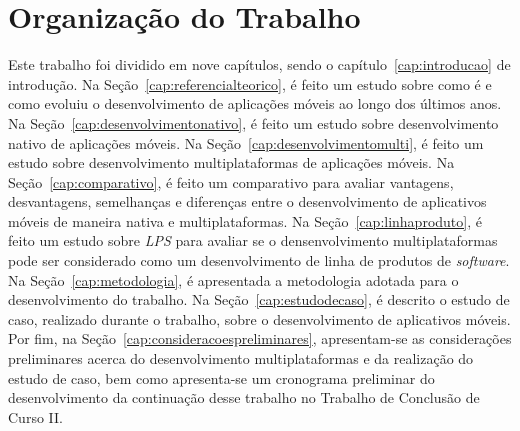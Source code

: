 \section{Organização do Trabalho}\label{sec:organizacao}

Este trabalho foi dividido em nove capítulos, sendo o capítulo~\ref{cap:introducao} de introdução. 
Na Seção~\ref{cap:referencialteorico}, é feito um estudo sobre como é e como evoluiu o desenvolvimento de aplicações móveis ao longo dos últimos anos. 
Na Seção~\ref{cap:desenvolvimentonativo}, é feito um estudo sobre desenvolvimento nativo de aplicações móveis.
Na Seção~\ref{cap:desenvolvimentomulti}, é feito um estudo sobre desenvolvimento multiplataformas de aplicações móveis.
Na Seção~\ref{cap:comparativo}, é feito um comparativo para avaliar vantagens, desvantagens, semelhanças e diferenças entre o desenvolvimento de aplicativos móveis de maneira nativa e multiplataformas.  
Na Seção~\ref{cap:linhaproduto}, é feito um estudo sobre \textit{LPS} para avaliar se o densenvolvimento multiplataformas pode ser considerado como um desenvolvimento de linha de produtos de \textit{software}.
Na Seção~\ref{cap:metodologia}, é apresentada a metodologia adotada para o desenvolvimento do trabalho.  
Na Seção~\ref{cap:estudodecaso}, é descrito o estudo de caso, realizado durante o trabalho, sobre o desenvolvimento de aplicativos móveis.
Por fim, na Seção~\ref{cap:consideracoespreliminares}, apresentam-se as considerações preliminares acerca do desenvolvimento multiplataformas e da realização do estudo de caso, bem como apresenta-se um 
cronograma preliminar do desenvolvimento da continuação desse trabalho no Trabalho de Conclusão de Curso II. 